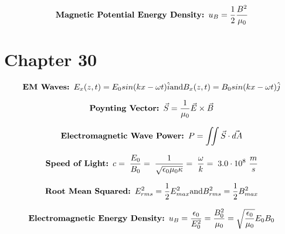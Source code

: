 \documentclass[fleqn]{article}
\begin{document}
\begin{equation}
    \label{eq3}
    \mbox{\textbf{Magnetic Potential Energy Density: }}u_B = \frac{1}{2}\frac{B^2}{\mu_0}
\end{equation}

\section*{Chapter 30}

\begin{equation}
    \label{eq3}
    \mbox{\textbf{EM Waves: }}
    {E_x}(z,t) = {E_0}sin(kx - \omega t)\hat{i} \\ \mbox{and} \\ {B_x}(z,t) = {B_0}sin(kx - \omega t)\hat{j}
\end{equation}


\begin{equation}
    \label{eq3}
    \mbox{\textbf{Poynting Vector: }}
    \vec{S} = \frac{1}{\mu_0}\vec{E} \times \vec{B} 
\end{equation}

\begin{equation}
    \label{eq3}
    \mbox{\textbf{Electromagnetic Wave Power: }}
    P = \iint \vec{S} \cdot \vec{dA}
\end{equation}

\begin{equation}
    \label{eq3}
    \mbox{\textbf{Speed of Light: }}
    c = \; \frac{E_0}{B_0} = \; \frac{1}{\sqrt{\epsilon_0\mu_0\kappa}} = \; \frac{\omega}{k}  = \; 3.0 \cdot 10^8 \  \frac{m}{s}
\end{equation}

\begin{equation}
    \label{eq3}
    \mbox{\textbf{Root Mean Squared: }}
    E_{rms}^{2} = \frac{1}{2}E_{max}^2 \\ \mbox{and} \\ B_{rms}^{2} = \frac{1}{2}B_{max}^2
\end{equation}

\begin{equation}
    \label{eq3}
    \mbox{\textbf{Electromagnetic Energy Density: }}
    u_B = \frac{\epsilon_0}{E_{0}^2} = \frac{B_0^2}{\mu_0} = \sqrt{\frac{\epsilon_0}{\mu_0}}E_0 B_0
\end{equation}
\end{document}
